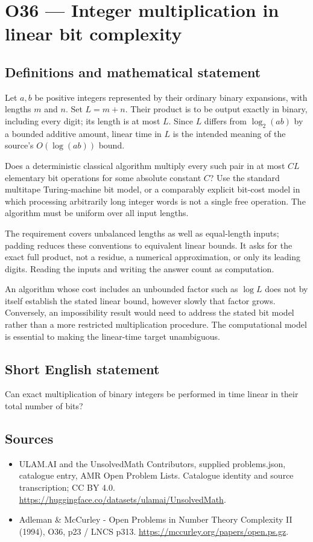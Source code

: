 \documentclass[11pt,a4paper]{article}
\begin{document}
\section*{O36 — Integer multiplication in linear bit complexity}\label{statement}

\subsection{Definitions and mathematical statement}
Let $a,b$ be positive integers represented by their ordinary binary expansions, with lengths $m$ and $n$. Set $L=m+n$. Their product is to be output exactly in binary, including every digit; its length is at most $L$. Since $L$ differs from $\log_2(ab)$ by a bounded additive amount, linear time in $L$ is the intended meaning of the source's $O(\log(ab))$ bound.

Does a deterministic classical algorithm multiply every such pair in at most $CL$ elementary bit operations for some absolute constant $C$? Use the standard multitape Turing-machine bit model, or a comparably explicit bit-cost model in which processing arbitrarily long integer words is not a single free operation. The algorithm must be uniform over all input lengths.

The requirement covers unbalanced lengths as well as equal-length inputs; padding reduces these conventions to equivalent linear bounds. It asks for the exact full product, not a residue, a numerical approximation, or only its leading digits. Reading the inputs and writing the answer count as computation.

An algorithm whose cost includes an unbounded factor such as $\log L$ does not by itself establish the stated linear bound, however slowly that factor grows. Conversely, an impossibility result would need to address the stated bit model rather than a more restricted multiplication procedure. The computational model is essential to making the linear-time target unambiguous.
\subsection{Short English statement}
Can exact multiplication of binary integers be performed in time linear in their total number of bits?
\subsection{Sources}
\begin{itemize}
\item[S1] ULAM.AI and the UnsolvedMath Contributors, supplied problems.json, catalogue entry, AMR Open Problem Lists. Catalogue identity and source transcription; CC BY 4.0.
\url{https://huggingface.co/datasets/ulamai/UnsolvedMath}.
\item[S2] Adleman \& McCurley - Open Problems in Number Theory Complexity II (1994), O36, p23 / LNCS p313. 
\url{https://mccurley.org/papers/open.ps.gz}.
\end{itemize}
\end{document}
